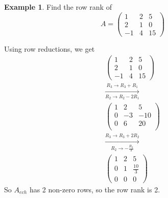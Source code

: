 \documentclass{report}
\theoremstyle{remark}
\theoremstyle{definition}
\theoremstyle{definition}
\newtheorem{example}[theorem]{Example}
\theoremstyle{theorem}
\begin{document}
\begin{example}
Find the row rank of
\[A = \begin{pmatrix}
1&2&5\\
2&1&0\\
-1&4&15 \end{pmatrix} \]
\end{example}
Using row reductions, we get
\begin{gather*}
\begin{pmatrix}
1&2&5\\
2&1&0\\
-1&4&15 \end{pmatrix}\\
    \xrightarrow[R_2 \rightarrow R_2 - 2R_1]{R_3 \rightarrow R_3 + R_1}\\
    \begin{pmatrix}
    1&2&5\\
    0&-3&-10\\
    0&6&20\\
    \end{pmatrix}\\
    \xrightarrow[R_2 \rightarrow -\frac{R_2}{3}]{R_3 \rightarrow R_3 + 2R_2}\\
    \begin{pmatrix}
    1&2&5\\
    0&1&\frac{10}{3}\\
    0&0&0
    \end{pmatrix}
\end{gather*}
So $A_{ech}$ has 2 non-zero rows, so the row rank is 2.
\end{document}

